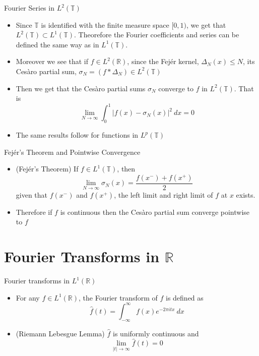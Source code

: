 \documentclass[compress]{beamer}
\newcommand{\R}{\mathbb R}
\newcommand{\T}{\mathbb T}
\begin{document}
\begin{frame}{Fourier Series in $L^2(\T)$}
  \begin{itemize}
    \item Since $\T$ is identified with the finite measure space $[0, 1)$, we get that $L^2(\T) \subset L^1(\T)$. Theorefore the Fourier coefficients and series can be defined the same way as in $L^1(\T)$.
    \item Moreover we see that if $f \in L^2(\R)$, since the Fej\'er kernel, $\Delta_N(x) \le N$, its Ces\`aro partial sum, $\sigma_N = (f*\Delta_N) \in L^2(\T)$
    \item Then we get that the Ces\`aro partial sums $\sigma_N$ converge to $f$ in $L^2(\T)$. That is $$\lim_{N\to \infty} \int_0^1 \left| f(x) - \sigma_N(x)\right|^2 \ dx  = 0 $$
    \item The same results follow for functions in $L^p(\T)$
  \end{itemize}
\end{frame}

\begin{frame}{Fej\'er's Theorem and Pointwise Convergence}
  \begin{itemize}
    \item (Fej\'er's Theorem) If $f \in L^1(\T)$, then $$\lim_{N \to \infty} \sigma_N(x) = \frac{f(x^-) + f(x^+)}{2}$$
    given that $f(x^-)$ and $f(x^+)$, the left limit and right limit of $f$ at $x$ exists.
    \item Therefore if $f$ is continuous then the Ces\`aro partial sum converge pointwise to $f$
  \end{itemize}
\end{frame}

\section{Fourier Transforms in $\R$}

\begin{frame}{Fourier transforms in $L^1(\R)$}
  \begin{itemize}
    \item For any $f\in L^1(\R)$, the Fourier transform of $f$ is defined as $$\hat{f}(t) = \int_{-\infty}^{\infty} f(x)e^{-2\pi i t x} \ dx $$
    \item (Riemann Lebesgue Lemma) $\hat{f}$ is uniformly continuous and $$\lim_{|t| \to \infty} \hat{f}(t) = 0$$
  \end{itemize}
\end{frame}
\end{document}
